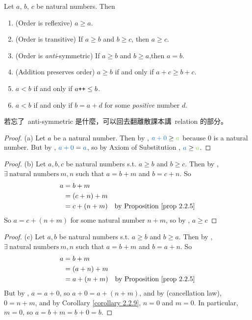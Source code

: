 \begin{proposition}  \label{prop 2.2.12}
Let \(a\), \(b\), \(c\) be natural numbers. Then
    \begin{enumerate}
        \item (Order is reflexive) \(a \geq a\).
        \item (Order is transitive) If \(a \geq b\) and \(b \geq c\), then \(a \geq c\).
        \item (Order is \emph{anti}-symmetric) If \(a \geq b\) and \(b \geq a\),then \(a = b\). 
        \item (Addition preserves order) \(a \geq b\) if and only if \(a + c \geq b + c\). 
        \item \(a < b\) if and only if \(a\texttt{++} \leq b\).
        \item \(a < b\) if and only if \(b = a + d\) for some \emph{positive} number \(d\).
    \end{enumerate}
\end{proposition}
\begin{note}
若忘了\ anti-symmetric 是什麼，可以回去翻離散課本講\ relation 的部分。
\end{note}

\begin{proof}{(a)}
Let \(a\) be a natural number. Then by , \(\BLUE{a + 0} \geq \GREEN{a}\) because \(0\) is a natural number. But by , \(\BLUE{a + 0} = \BLUE{a}\), so by Axiom of Substitution , \(\BLUE{a} \geq \GREEN{a}\).
\end{proof}

\begin{proof}{(b)}
Let \(a, b, c\) be natural numbers s.t. \(a \geq b\) and \(b \geq c\). Then by , \(\exists\ \text{natural numbers}\ m, n\) such that \(a = b + m\) and \(b = c + n\). So
\begin{align*}
    a & = b + m & \\
      & = (c + n) + m & \\
      & = c + (n + m) & \text{by \PROP{2.2.5}}\\
\end{align*}
So \(a = c + (n + m)\) for some natural number \(n + m\), so by , \(a \geq c\)
\end{proof}

\begin{proof}{(c)}
Let \(a, b\) be natural numbers s.t. \(a \geq b\) and \(b \geq a\). Then by , \(\exists\ \text{natural numbers}\ m, n\) such that \(a = b + m\) and \(b = a + n\). So
\begin{align*}
    a & = b + m & \\
      & = (a + n) + m & \\
      & = a + (n + m) & \text{by \PROP{2.2.5}}\\
\end{align*}
But by , \(a = a + 0\), so \(a + 0 = a + (n + m)\), and by  (cancellation law), \(0 = n + m\), and by Corollary \ref{corollary 2.2.9}, \(n = 0\) and \(m = 0\). In particular, \(m = 0\), so \(a = b + m = b + 0 = b\).
\end{proof}

